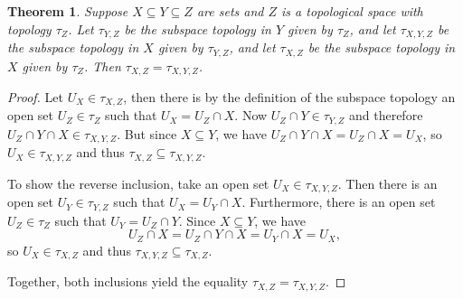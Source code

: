 \documentclass[12pt]{article}
\newtheorem{thm}{Theorem}
\begin{document}
\begin{thm} Suppose $X\subseteq Y \subseteq Z$ are sets and $Z$ is a
topological space with topology $\tau_Z$.
Let $\tau_{Y,Z}$ be the subspace topology in $Y$ given by $\tau_Z$,
and let $\tau_{X,Y,Z}$ be the subspace topology in $X$ given by
$\tau_{Y,Z}$, and let $\tau_{X,Z}$ be the subspace topology in $X$
given by $\tau_Z$. Then $\tau_{X,Z}=\tau_{X,Y,Z}$.
\end{thm}

\begin{proof}
Let $U_X\in\tau_{X,Z}$, then there is by the definition of the subspace
topology an open set $U_Z\in\tau_Z$ such that $U_X=U_Z\cap X$. Now
$U_Z\cap Y\in\tau_{Y,Z}$ and therefore $U_Z\cap Y\cap
X\in\tau_{X,Y,Z}$. But since $X\subseteq Y$, we have $U_Z\cap Y\cap
X=U_Z\cap X=U_X$, so $U_X\in\tau_{X,Y,Z}$ and thus
$\tau_{X,Z}\subseteq\tau_{X,Y,Z}$.

To show the reverse inclusion, take an open set
$U_X\in\tau_{X,Y,Z}$. Then there is an open set $U_Y\in\tau_{Y,Z}$
such that $U_X=U_Y\cap X$. Furthermore, there is an open set
$U_Z\in\tau_Z$ such that $U_Y=U_Z\cap Y$. Since $X\subseteq Y$, we
have
\begin{equation*}
U_Z\cap X=U_Z\cap Y\cap X=U_Y\cap X=U_X,
\end{equation*}
so $U_X\in\tau_{X,Z}$ and thus $\tau_{X,Y,Z}\subseteq\tau_{X,Z}$.

Together, both inclusions yield the equality $\tau_{X,Z}=\tau_{X,Y,Z}$.
\end{proof}
\end{document}
